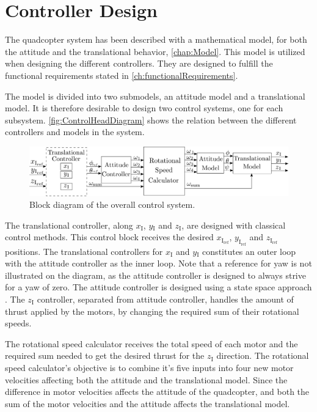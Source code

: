 \chapter{Controller Design}\label{chap:Control}
The quadcopter system has been described with a mathematical model, for both the attitude and the translational behavior, \autoref{chap:Model}. This model is utilized when designing the different controllers. They are designed to fulfill the functional requirements stated in \autoref{ch:functionalRequirements}.

The model is divided into two submodels, an attitude model and a translational model. It is therefore desirable to design two control systems, one for each subsystem. \autoref{fig:ControlHeadDiagram} shows the relation between the different controllers and models in the system.

%
\begin{figure}[H]
	\centering
	\includegraphics[width=1 \textwidth]{figures/generalcontroldiagram2}
	\caption{Block diagram of the overall control system.}
	\label{fig:ControlHeadDiagram}
\end{figure}
%
The translational controller, along $x_{\mathrm{I}}$, $y\mathrm{_I}$ and $z\mathrm{_I}$, are designed with classical control methods. This control block receives the desired $x_\mathrm{I_{ref}}$, $y_\mathrm{I_{ref}}$ and $z_\mathrm{I_{ref}}$ positions. The translational controllers for $x\mathrm{_I}$ and $y\mathrm{_I}$ constitutes an outer loop with the attitude controller as the inner loop. Note that a reference for yaw is not illustrated on the diagram, as the attitude controller is designed to always strive for a yaw of zero. The attitude controller is designed using a state space approach \cite{ssReference}. The $z\mathrm{_I}$ controller, separated from attitude controller, handles the amount of thrust applied by the motors, by changing the required sum of their rotational speeds.

The rotational speed calculator receives the total speed of each motor and the required sum needed to get the desired thrust for the $z\mathrm{_I}$ direction. The rotational speed calculator's objective is to combine it's five inputs into four new motor velocities affecting both the attitude and the translational model. Since the difference in motor velocities affects the attitude of the quadcopter, and both the sum of the motor velocities and the attitude affects the translational model.

